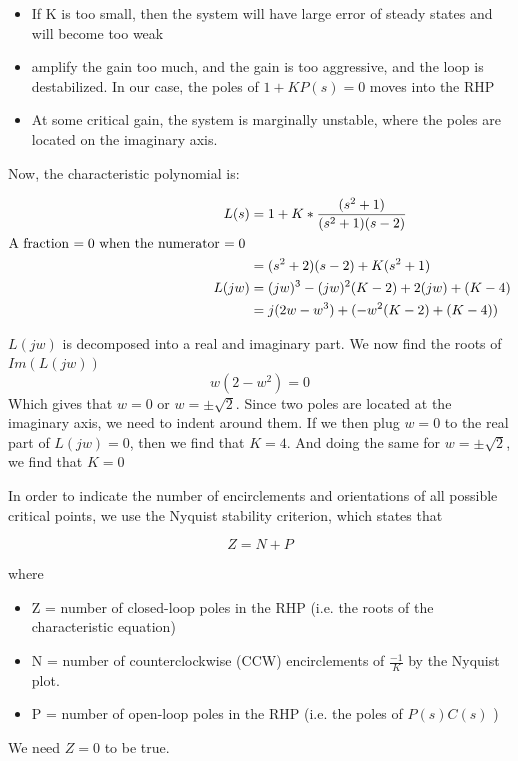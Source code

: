 \documentclass[12pt,A4, onecolumn]{exam}
\begin{document}
\begin{questions}
\begin{parts}
\begin{solution}
  \begin{itemize}
    \item If K is too small, then the system will have large error of steady states and will become too weak
    \item amplify the gain too much, and the gain is too aggressive, and the loop is destabilized. In our case, the poles of $ 1+KP(s)=0 $ moves into the RHP 
    \item At some critical gain, the system is marginally unstable, where the poles are located on the imaginary axis.
  \end{itemize}
  

  Now, the characteristic polynomial is:

  \begin{align*}
    L(s) &= 1 + K * \frac{(s^2+1)} {(s^2+1)(s-2)} \\
    \text{A fraction $ =0 $ when the numerator $ =0 $  }\\
    &= (s^2+2)(s-2) + K(s^2+1)  \\
    L(jw) &= (jw)^3-(jw)^2(K-2)+2(jw) + (K-4) \\
    &= j(2w-w^3) + (-w^2(K-2) + (K-4))
  \end{align*}

  $ L(jw) $ is decomposed into a real and imaginary part. We now find the roots of $ Im(L(jw)) $
  \[
     w(2-w^2) = 0
  \] 
  Which gives that $w = 0$ or $w = \pm \sqrt{2}$. Since two poles are located at the imaginary axis, we need to indent around them. If we then plug $ w = 0 $ to the real part of $ L(jw) = 0 $, then we find that $ K=4 $. And doing the same for $ w = \pm \sqrt{2} $, we find that $ K=0 $ 
  

  In order to indicate the number of encirclements and orientations of all possible critical points, we use the Nyquist stability criterion, which states that 

  \[
     Z = N+P
  \] 

  where \begin{itemize}
    \item Z = number of closed-loop poles in the RHP (i.e. the roots of the characteristic equation)
    \item N = number of counterclockwise (CCW) encirclements of $ \frac{-1} {K} $ by the Nyquist plot.
    \item P = number of open-loop poles in the RHP (i.e. the poles of $ P(s)C(s ) $ )
  \end{itemize}

  We need $ Z=0 $ to be true. 


\end{solution}
\end{parts}
\end{questions}
\end{document}
